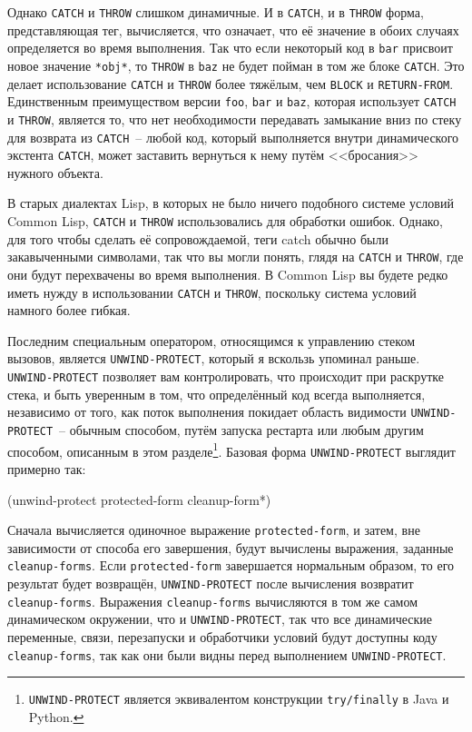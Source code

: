 Однако \lstinline{CATCH} и \lstinline{THROW} слишком динамичные.  И в \lstinline{CATCH}, и в
\lstinline{THROW} форма, представляющая тег, вычисляется, что означает, что её значение в
обоих случаях определяется во время выполнения.  Так что если некоторый код в \lstinline{bar}
присвоит новое значение \lstinline{*obj*}, то \lstinline{THROW} в \lstinline{baz} не будет пойман в том
же блоке \lstinline{CATCH}.  Это делает использование \lstinline{CATCH} и \lstinline{THROW} более тяжёлым,
чем \lstinline{BLOCK} и \lstinline{RETURN-FROM}. Единственным преимуществом версии \lstinline{foo},
\lstinline{bar} и \lstinline{baz}, которая использует \lstinline{CATCH} и \lstinline{THROW}, является то, что
нет необходимости передавать замыкание вниз по стеку для возврата из \lstinline{CATCH}~--
любой код, который выполняется внутри динамического экстента \lstinline{CATCH}, может заставить
вернуться к нему путём <<бросания>>  нужного объекта.

В старых диалектах Lisp, в которых не было ничего подобного системе условий Common Lisp,
\lstinline{CATCH} и \lstinline{THROW} использовались для обработки ошибок.  Однако, для того чтобы
сделать её сопровождаемой, теги catch обычно были закавыченными символами, так что вы могли
понять, глядя на \lstinline{CATCH} и \lstinline{THROW}, где они будут перехвачены во время
выполнения. В Common Lisp вы будете редко иметь нужду в использовании \lstinline{CATCH} и
\lstinline{THROW}, поскольку система условий намного более гибкая.

Последним специальным оператором, относящимся к управлению стеком вызовов, является
\lstinline{UNWIND-PROTECT}, который я вскользь упоминал раньше. \lstinline{UNWIND-PROTECT} позволяет
вам контролировать, что происходит при раскрутке стека, и быть уверенным в том, что
определённый код всегда выполняется, независимо от того, как поток выполнения покидает
область видимости \lstinline{UNWIND-PROTECT}~-- обычным способом, путём запуска рестарта или
любым другим способом, описанным в этом разделе\footnote{\lstinline{UNWIND-PROTECT} является
  эквивалентом конструкции \lstinline{try/finally} в Java и Python.}.  Базовая форма
\lstinline{UNWIND-PROTECT} выглядит примерно так:

\begin{myverb}
(unwind-protect protected-form
  cleanup-form*)
\end{myverb}

Сначала вычисляется одиночное выражение \lstinline{protected-form}, и затем, вне зависимости от
способа его завершения, будут вычислены выражения, заданные \lstinline{cleanup-forms}.  Если
\lstinline{protected-form} завершается нормальным образом, то его результат будет возвращён,
\lstinline{UNWIND-PROTECT} после вычисления возвратит \lstinline{cleanup-forms}. Выражения
\lstinline{cleanup-forms} вычисляются в том же самом динамическом окружении, что и
\lstinline{UNWIND-PROTECT}, так что все динамические переменные, связи, перезапуски и
обработчики условий будут доступны коду \lstinline{cleanup-forms}, так как они были видны
перед выполнением \lstinline{UNWIND-PROTECT}.

